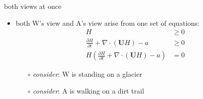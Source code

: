 \documentclass[10pt,hyperref,dvipsnames]{beamer}
\newcommand{\bU}{\mathbf{U}}
\newcommand{\Div}{\nabla\cdot}
\begin{document}
\begin{frame}{both views at once}
\begin{itemize}
\item both W's view and A's view arise from one set of equations:
\begin{align*}
H &\ge 0 \\
\frac{\partial H}{\partial t} + \Div \left(\bU H\right) - a &\ge 0 \\
H \left(\frac{\partial H}{\partial t} + \Div \left(\bU H\right) - a\right) &= 0
\end{align*}

\begin{itemize}
\item[$\circ$] \emph{consider}: W is standing on a glacier
\item[$\circ$] \emph{consider}: A is walking on a dirt trail
\end{itemize}

\end{itemize}
\end{frame}
\end{document}
